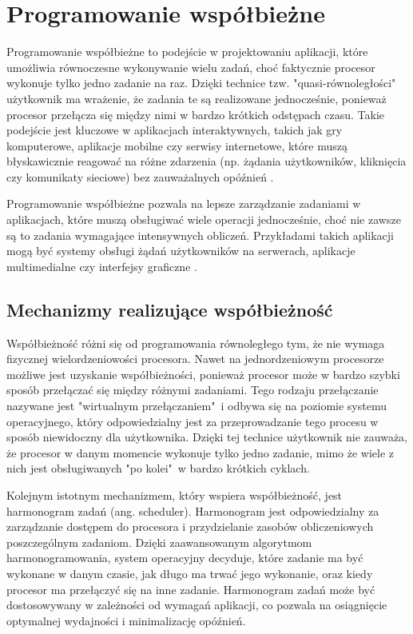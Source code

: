 \section{Programowanie współbieżne}

Programowanie współbieżne to podejście w projektowaniu aplikacji, które umożliwia równoczesne wykonywanie wielu zadań, choć faktycznie procesor wykonuje tylko jedno zadanie na raz. Dzięki technice tzw. "quasi-równoległości"\ \cite{Paluch} użytkownik ma wrażenie, że zadania te są realizowane jednocześnie, ponieważ procesor przełącza się między nimi w bardzo krótkich odstępach czasu. Takie podejście jest kluczowe w aplikacjach interaktywnych, takich jak gry komputerowe, aplikacje mobilne czy serwisy internetowe, które muszą błyskawicznie reagować na różne zdarzenia (np. żądania użytkowników, kliknięcia czy komunikaty sieciowe) bez zauważalnych opóźnień \cite{MasteringConcurrencyAndParallelProgramming}.

Programowanie współbieżne pozwala na lepsze zarządzanie zadaniami w aplikacjach, które muszą obsługiwać wiele operacji jednocześnie, choć nie zawsze są to zadania wymagające intensywnych obliczeń. Przykładami takich aplikacji mogą być systemy obsługi żądań użytkowników na serwerach, aplikacje multimedialne czy interfejsy graficzne \cite{IntroductionToConcurrencyAndParallelism}.

\subsection{Mechanizmy realizujące współbieżność}
Współbieżność różni się od programowania równoległego tym, że nie wymaga fizycznej wielordzeniowości procesora. Nawet na jednordzeniowym procesorze możliwe jest uzyskanie współbieżności, ponieważ procesor może w bardzo szybki sposób przełączać się między różnymi zadaniami. Tego rodzaju przełączanie nazywane jest "wirtualnym przełączaniem"\ i odbywa się na poziomie systemu operacyjnego, który odpowiedzialny jest za przeprowadzanie tego procesu w sposób niewidoczny dla użytkownika. Dzięki tej technice użytkownik nie zauważa, że procesor w danym momencie wykonuje tylko jedno zadanie, mimo że wiele z nich jest obsługiwanych "po kolei"\ w bardzo krótkich cyklach.

Kolejnym istotnym mechanizmem, który wspiera współbieżność, jest harmonogram zadań (ang. scheduler). Harmonogram jest odpowiedzialny za zarządzanie dostępem do procesora i przydzielanie zasobów obliczeniowych poszczególnym zadaniom. Dzięki zaawansowanym algorytmom harmonogramowania, system operacyjny decyduje, które zadanie ma być wykonane w danym czasie, jak długo ma trwać jego wykonanie, oraz kiedy procesor ma przełączyć się na inne zadanie. Harmonogram zadań może być dostosowywany w zależności od wymagań aplikacji, co pozwala na osiągnięcie optymalnej wydajności i minimalizację opóźnień.

